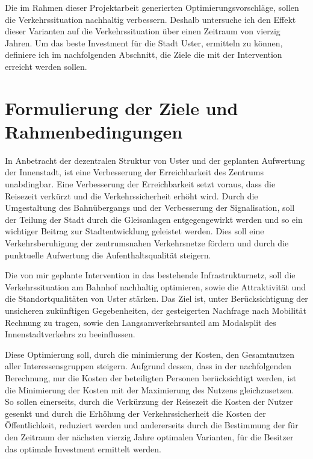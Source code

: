 Die im Rahmen dieser Projektarbeit generierten Optimierungsvorschläge, sollen die Verkehrssituation nachhaltig verbessern. Deshalb untersuche ich den Effekt dieser Varianten auf die Verkehrssituation über einen Zeitraum von vierzig Jahren. Um das beste Investment für die Stadt Uster, ermitteln zu können, definiere ich im nachfolgenden Abschnitt, die Ziele die mit der Intervention erreicht werden sollen.

\pagebreak

\section{Formulierung der Ziele und Rahmenbedingungen}
\label{sec:Zielformulierung}

In Anbetracht der dezentralen Struktur von Uster und der geplanten Aufwertung der Innenstadt, ist eine Verbesserung der Erreichbarkeit des Zentrums unabdingbar. Eine Verbesserung der Erreichbarkeit setzt voraus, dass die Reisezeit verkürzt und die Verkehrssicherheit erhöht wird. Durch die Umgestaltung des Bahnübergangs und der Verbesserung der Signalisation, soll der Teilung der Stadt durch die Gleisanlagen entgegengewirkt werden und so ein wichtiger Beitrag zur Stadtentwicklung geleistet werden. Dies soll eine Verkehrsberuhigung der zentrumsnahen Verkehrsnetze fördern und durch die punktuelle Aufwertung die Aufenthaltsqualität steigern.

Die von mir geplante Intervention in das bestehende Infrastrukturnetz, soll die Verkehrssituation am Bahnhof nachhaltig optimieren, sowie die Attraktivität und die Standortqualitäten von Uster stärken. Das Ziel ist, unter Berücksichtigung der unsicheren zukünftigen Gegebenheiten, der gesteigerten Nachfrage nach Mobilität Rechnung zu tragen, sowie den Langsamverkehrsanteil am Modalsplit des Innenstadtverkehrs zu beeinflussen.
 
Diese Optimierung soll, durch die minimierung der Kosten, den Gesamtnutzen aller Interessensgruppen steigern. Aufgrund dessen, dass in der nachfolgenden Berechnung, nur die Kosten der beteiligten Personen berücksichtigt werden, ist die Minimierung der Kosten mit der Maximierung des Nutzens gleichzusetzen. \\
So sollen einerseits, durch die Verkürzung der Reisezeit die Kosten der Nutzer gesenkt und durch die Erhöhung der Verkehrssicherheit die Kosten der Öffentlichkeit, reduziert werden und andererseits durch die Bestimmung der für den Zeitraum der nächsten vierzig Jahre optimalen Varianten, für die Besitzer das optimale Investment ermittelt werden.


